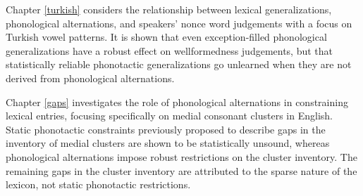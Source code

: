 Chapter \ref{turkish} considers the relationship between lexical generalizations, phonological alternations, and speakers' nonce word judgements with a focus on Turkish vowel patterns. It is shown that even exception-filled phonological generalizations have a robust effect on wellformedness judgements, but that statistically reliable phonotactic generalizations go unlearned when they are not derived from phonological alternations.

Chapter \ref{gaps} investigates the role of phonological alternations in constraining lexical entries, focusing specifically on medial consonant clusters in English. Static phonotactic constraints previously proposed to describe gaps in the inventory of medial clusters are shown to be statistically unsound, whereas phonological alternations impose robust restrictions on the cluster inventory. The remaining gaps in the cluster inventory are attributed to the sparse nature of the lexicon, not static phonotactic restrictions.



